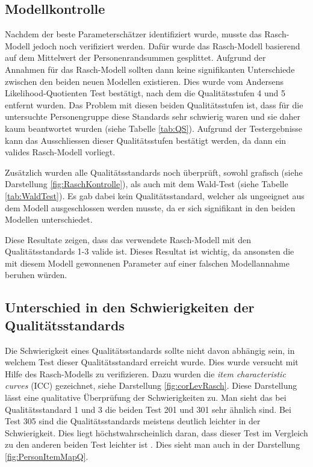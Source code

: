 \subsection{Modellkontrolle}

Nachdem der beste Parameterschätzer identifiziert wurde, musste das Rasch-Modell jedoch noch verifiziert werden. Dafür wurde das Rasch-Modell basierend auf dem Mittelwert der Personenrandsummen gesplittet. Aufgrund der Annahmen für das Rasch-Modell sollten dann keine signifikanten Unterschiede zwischen den beiden neuen Modellen existieren. Dies wurde vom Andersens Likelihood-Quotienten Test bestätigt, nach dem die Qualitätsstufen 4 und 5 entfernt wurden. Das Problem mit diesen beiden Qualitätsstufen ist, dass für die untersuchte Personengruppe diese Standards sehr schwierig waren und sie daher kaum beantwortet wurden (siehe Tabelle \ref{tab:QS}). Aufgrund der Testergebnisse kann das Ausschliessen dieser Qualitätsstufen bestätigt werden, da dann ein valides Rasch-Modell vorliegt.

Zusätzlich wurden alle Qualitätsstandards noch überprüft, sowohl grafisch (siehe Darstellung \ref{fig:RaschKontrolle}), als auch mit dem Wald-Test (siehe Tabelle \ref{tab:WaldTest}). Es gab dabei kein Qualitätsstandard, welcher als ungeeignet aus dem Modell ausgeschlossen werden musste, da er sich signifikant in den beiden Modellen unterschiedet.

Diese Resultate zeigen, dass das verwendete Rasch-Modell mit den Qualitätsstandards 1-3 valide ist. Dieses Resultat ist wichtig, da ansonsten die mit diesem Modell gewonnenen Parameter auf einer falschen Modellannahme beruhen würden.

\subsection{Unterschied in den Schwierigkeiten der Qualitätsstandards}

Die Schwierigkeit eines Qualitätsstandards sollte nicht davon abhängig sein, in welchem Test dieser Qualitätsstandard erreicht wurde. Dies wurde versucht mit Hilfe des Rasch-Modells zu verifizieren. Dazu wurden die \textit{item characteristic curves} (ICC) gezeichnet, siehe Darstellung \ref{fig:corLevRasch}. Diese Darstellung lässt eine qualitative Überprüfung der Schwierigkeiten zu. Man sieht das bei Qualitätsstandard 1 und 3 die beiden Test 201 und 301 sehr ähnlich sind. Bei Test 305 sind die Qualitätsstandards meistens deutlich leichter in der Schwierigkeit. Dies liegt höchstwahrscheinlich daran, dass dieser Test im Vergleich zu den anderen beiden Test leichter ist \citep{Sichau2015}. Dies sieht man auch in der Darstellung \ref{fig:PersonItemMapQ}.

